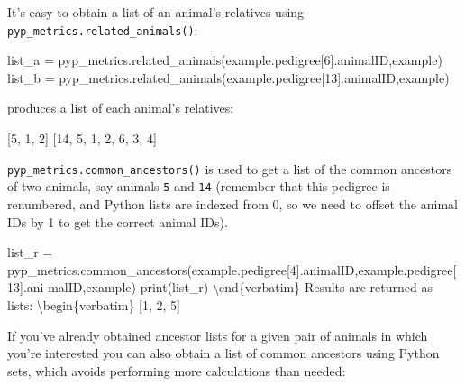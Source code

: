 \documentclass[
  letterpaper,
  DIV=11,
  numbers=noendperiod]{scrreprt}
\newenvironment{Shaded}{\begin{snugshade}}{\end{snugshade}}
\newcommand{\BuiltInTok}[1]{\textcolor[rgb]{0.00,0.23,0.31}{#1}}
\newcommand{\DecValTok}[1]{\textcolor[rgb]{0.68,0.00,0.00}{#1}}
\newcommand{\ImportTok}[1]{\textcolor[rgb]{0.00,0.46,0.62}{#1}}
\newcommand{\NormalTok}[1]{\textcolor[rgb]{0.00,0.23,0.31}{#1}}
\newcommand{\OperatorTok}[1]{\textcolor[rgb]{0.37,0.37,0.37}{#1}}
\begin{document}
It's easy to obtain a list of an animal's relatives using
\texttt{pyp\_metrics.related\_animals()}:

\begin{Shaded}
\begin{Highlighting}[]
\NormalTok{list\_a }\OperatorTok{=}\NormalTok{ pyp\_metrics.related\_animals(example.pedigree[}\DecValTok{6}\NormalTok{].animalID,example)}
\NormalTok{list\_b }\OperatorTok{=}\NormalTok{ pyp\_metrics.related\_animals(example.pedigree[}\DecValTok{13}\NormalTok{].animalID,example)}
\end{Highlighting}
\end{Shaded}

produces a list of each animal's relatives:

\begin{Shaded}
\begin{Highlighting}[]
\NormalTok{[}\DecValTok{5}\NormalTok{, }\DecValTok{1}\NormalTok{, }\DecValTok{2}\NormalTok{]}
\NormalTok{[}\DecValTok{14}\NormalTok{, }\DecValTok{5}\NormalTok{, }\DecValTok{1}\NormalTok{, }\DecValTok{2}\NormalTok{, }\DecValTok{6}\NormalTok{, }\DecValTok{3}\NormalTok{, }\DecValTok{4}\NormalTok{]}
\end{Highlighting}
\end{Shaded}

\texttt{pyp\_metrics.common\_ancestors()} is used to get a list of the
common ancestors of two animals, say animals \texttt{5} and \texttt{14}
(remember that this pedigree is renumbered, and Python lists are indexed
from 0, so we need to offset the animal IDs by 1 to get the correct
animal IDs).

\begin{Shaded}
\begin{Highlighting}[]
\NormalTok{list\_r }\OperatorTok{=}\NormalTok{ pyp\_metrics.common\_ancestors(example.pedigree[}\DecValTok{4}\NormalTok{].animalID,example.pedigree[}\DecValTok{13}\NormalTok{].ani}
\NormalTok{malID,example)}
\BuiltInTok{print}\NormalTok{(list\_r)}
\NormalTok{\textbackslash{}end\{verbatim\}}
\NormalTok{Results are returned }\ImportTok{as}\NormalTok{ lists:}
\NormalTok{\textbackslash{}begin\{verbatim\}}
\NormalTok{[}\DecValTok{1}\NormalTok{, }\DecValTok{2}\NormalTok{, }\DecValTok{5}\NormalTok{]}
\end{Highlighting}
\end{Shaded}

If you've already obtained ancestor lists for a given pair of animals in
which you're interested you can also obtain a list of common ancestors
using Python sets, which avoids performing more calculations than
needed:
\end{document}
